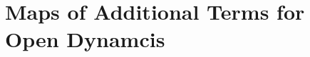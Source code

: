 \documentclass[%
reprint,
superscriptaddress,
nofootinbib,
 amsmath,amssymb,
prx,
floatfix,
]{revtex4-2}
\begin{document}




\section{Maps of Additional Terms for Open Dynamcis \label{app:noise}}
\end{document}
